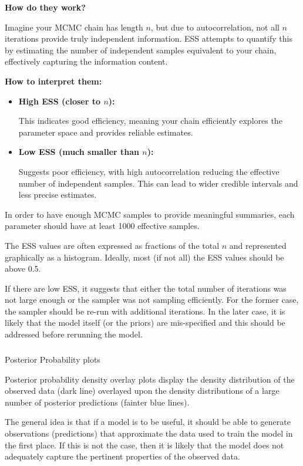 \documentclass[
  8pt,
  a4paper]{article}
\makeatletter
\let\oldsubparagraph\subparagraph
\renewcommand{\subparagraph}{
    \@ifstar
      \xxxSubParagraphStar
      \xxxSubParagraphNoStar
  }
\newcommand{\xxxSubParagraphStar}[1]{\oldsubparagraph*{#1}\mbox{}}
\newcommand{\xxxSubParagraphNoStar}[1]{\oldsubparagraph{#1}\mbox{}}
\makeatother
\begin{document}
\textbf{How do they work?}

Imagine your MCMC chain has length \(n\), but due to autocorrelation,
not all \(n\) iterations provide truly independent information. ESS
attempts to quantify this by estimating the number of independent
samples equivalent to your chain, effectively capturing the information
content.

\textbf{How to interpret them:}

\begin{itemize}
\item
  \textbf{High ESS (closer to \(n\)):}

  This indicates good efficiency, meaning your chain efficiently
  explores the parameter space and provides reliable estimates.
\item
  \textbf{Low ESS (much smaller than \(n\)):}

  Suggests poor efficiency, with high autocorrelation reducing the
  effective number of independent samples. This can lead to wider
  credible intervals and less precise estimates.
\end{itemize}

In order to have enough MCMC samples to provide meaningful summaries,
each parameter should have at least 1000 effective samples.

The ESS values are often expressed as fractions of the total \(n\) and
represented graphically as a histogram. Ideally, most (if not all) the
ESS values should be above 0.5.

If there are low ESS, it suggests that either the total number of
iterations was not large enough or the sampler was not sampling
efficiently. For the former case, the sampler should be re-run with
additional iterations. In the later case, it is likely that the model
itself (or the priors) are mis-specified and this should be addressed
before rerunning the model.

\subparagraph{Posterior Probability
plots}\label{posterior-probability-plots}

Posterior probability density overlay plots display the density
distribution of the observed data (dark line) overlayed upon the density
distributions of a large number of posterior predictions (fainter blue
lines).

The general idea is that if a model is to be useful, it should be able
to generate observations (predictions) that approximate the data used to
train the model in the first place. If this is not the case, then it is
likely that the model does not adequately capture the pertinent
properties of the observed data.
\end{document}
